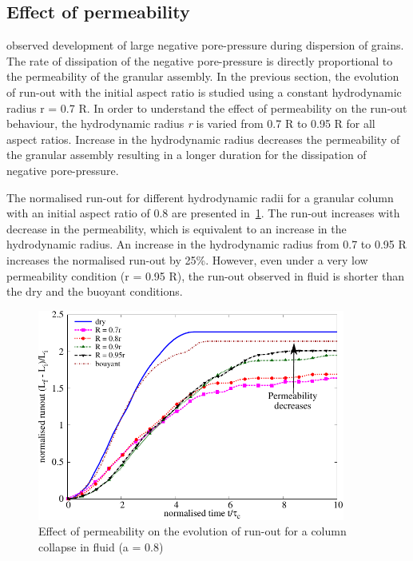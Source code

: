 \clearpage

\subsection{Effect of permeability}
\citet{Topin2011} observed development of large negative pore-pressure during 
dispersion of grains. The rate of dissipation of the negative pore-pressure is 
directly proportional to the permeability of the granular assembly. In the 
previous section, the evolution of run-out with the initial aspect ratio is 
studied using a constant hydrodynamic radius r = 0.7 R. In order to understand 
the effect of permeability on the run-out behaviour, the hydrodynamic radius 
\textit{r} 
is varied from 0.7 R to 0.95 R for all aspect ratios. Increase in 
the hydrodynamic radius decreases the permeability of the granular assembly 
resulting in a longer duration for the dissipation of negative pore-pressure. 

The normalised run-out for different hydrodynamic radii for a granular column 
with an initial aspect ratio of 0.8 are presented 
in~\cref{fig:Runout_a08_dense}. The run-out increases with decrease in the 
permeability, which is equivalent to an increase in the hydrodynamic radius. 
An increase in the hydrodynamic radius from 0.7 to 0.95 R increases the 
normalised run-out by 25\%. However, even under a very low permeability 
condition (r = 0.95 R), the run-out observed in fluid is shorter than the dry 
and the buoyant conditions. 

\begin{figure}[htpb]
\centering
\includegraphics[width=0.9\textwidth]{Runout_a08_dense}
\caption{Effect of permeability on the evolution of run-out for a column 
collapse in fluid (a = 0.8)}
\label{fig:Runout_a08_dense}
\end{figure}

